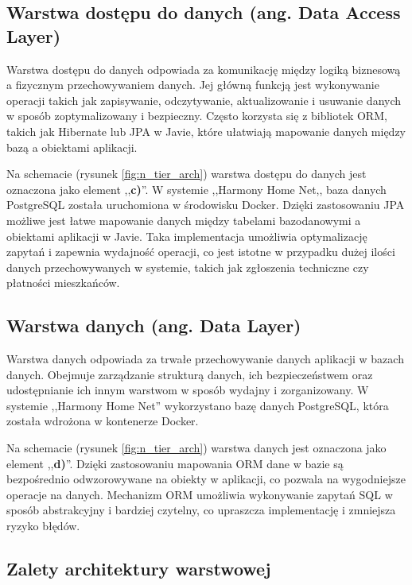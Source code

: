 \subsection{Warstwa dostępu do danych (ang. Data Access Layer)}

Warstwa dostępu do danych odpowiada za komunikację między logiką biznesową a fizycznym przechowywaniem danych. Jej główną funkcją jest wykonywanie operacji takich jak zapisywanie, odczytywanie, aktualizowanie i usuwanie danych w sposób zoptymalizowany i bezpieczny. Często korzysta się z bibliotek ORM, takich jak Hibernate lub JPA w Javie, które ułatwiają mapowanie danych między bazą a obiektami aplikacji.

Na schemacie (rysunek \ref{fig:n_tier_arch}) warstwa dostępu do danych jest oznaczona jako element ,,\textbf{c)}''. W systemie ,,Harmony Home Net,, baza danych PostgreSQL została uruchomiona w środowisku Docker. Dzięki zastosowaniu JPA możliwe jest łatwe mapowanie danych między tabelami bazodanowymi a obiektami aplikacji w Javie. Taka implementacja umożliwia optymalizację zapytań i zapewnia wydajność operacji, co jest istotne w przypadku dużej ilości danych przechowywanych w systemie, takich jak zgłoszenia techniczne czy płatności mieszkańców.

\subsection{Warstwa danych (ang. Data Layer)}

Warstwa danych odpowiada za trwałe przechowywanie danych aplikacji w bazach danych. Obejmuje zarządzanie strukturą danych, ich bezpieczeństwem oraz udostępnianie ich innym warstwom w sposób wydajny i zorganizowany. W systemie ,,Harmony Home Net'' wykorzystano bazę danych PostgreSQL, która została wdrożona w kontenerze Docker. 

Na schemacie (rysunek \ref{fig:n_tier_arch}) warstwa danych jest oznaczona jako element ,,\textbf{d)}''. Dzięki zastosowaniu mapowania ORM dane w bazie są bezpośrednio odwzorowywane na obiekty w aplikacji, co pozwala na wygodniejsze operacje na danych. Mechanizm ORM umożliwia wykonywanie zapytań SQL w sposób abstrakcyjny i bardziej czytelny, co upraszcza implementację i zmniejsza ryzyko błędów.

\subsection{Zalety architektury warstwowej}

